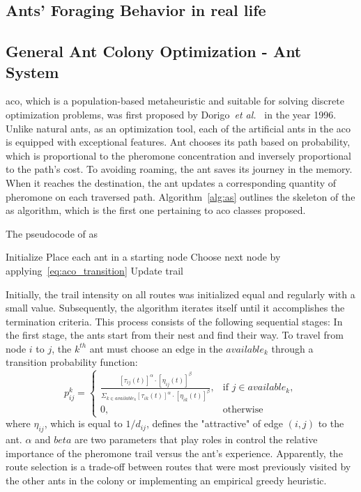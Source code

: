 \subsection{Ants’ Foraging Behavior in real life}

\subsection{General Ant Colony Optimization - Ant System}
\acrfull{aco}, which is a population-based metaheuristic and suitable for solving discrete optimization problems, was first proposed by Dorigo~\textit{et al.}~\cite{dorigo1996ant} in the year 1996. Unlike natural ants, as an optimization tool, each of the artificial ants in the \gls{aco} is equipped with exceptional features. Ant chooses its path based on probability, which is proportional to the pheromone concentration and inversely proportional to the path's cost. To avoiding roaming, the ant saves its journey in the memory. When it reaches the destination, the ant updates a corresponding quantity of pheromone on each traversed path. Algorithm~\ref{alg:as} outlines the skeleton of the \gls{as} algorithm, which is the first one pertaining to \gls{aco} classes proposed.

\begin{algorithm}
	\caption{The pseudocode of \gls{as}}
	\label{alg:as}
	\Begin
	{	
		Initialize 
		{
			Place each ant in a starting node\;
			{
				{
					Choose next node by applying~\ref{eq:aco_transition} \;
					Update trail\;
				}
			}
		}
	}
\end{algorithm}

Initially, the trail intensity on all routes was initialized equal and regularly with a small value. Subsequently, the algorithm iterates itself until it accomplishes the termination criteria. This process consists of the following sequential stages: In the first stage, the ants start from their nest and find their way. To travel from node $i$ to $j$, the $k^{th}$ ant must choose an edge in the $available_k$ through a transition probability function:
\begin{equation}
\label{eq:aco_transition}
p^k_{ij} =
\begin{cases}
	\frac{[\tau_{ij}(t)]^{\alpha} \cdot [\eta_{ij}(t)]^{\beta}} {\Sigma_{k \in available_k} [\tau_{ik}(t)]^{\alpha}\cdot [\eta_{ik}(t)]^{\beta}}, & \text{if $j \in available_k$}, \\
	0, & \text{otherwise}
\end{cases}
\end{equation}
where $\eta_{ij}$, which is equal to $1/d_{ij}$, defines the "attractive" of edge $(i,j)$ to the ant. $\alpha$ and $beta$ are two parameters that play roles in control the relative importance of the pheromone trail versus the ant's experience. Apparently, the route selection is a trade-off between routes that were most previously visited by the other ants in the colony or implementing an empirical greedy heuristic. 

